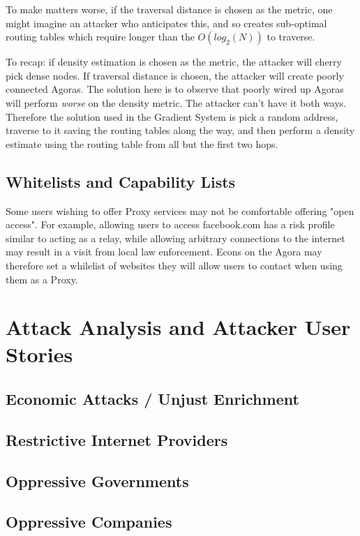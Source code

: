 \documentclass{article}
\begin{document}
To make matters worse, if the traversal distance is chosen as the metric, one might imagine an attacker who anticipates this, and so creates sub-optimal routing tables which require longer than the $O(log_2(N))$ to traverse.

To recap: if density estimation is chosen as the metric, the attacker will cherry pick dense nodes. If traversal distance is chosen, the attacker will create poorly connected Agoras. The solution here is to observe that poorly wired up Agoras will perform \emph{worse} on the density metric. The attacker can't have it both ways. Therefore the solution used in the Gradient System is pick a random address, traverse to it saving the routing tables along the way, and then perform a density estimate using the routing table from all but the first two hops.

\subsection{Whitelists and Capability Lists}

Some users wishing to offer Proxy services may not be comfortable offering "open access". For example, allowing users to access facebook.com has a risk profile similar to acting as a relay, while allowing arbitrary connections to the internet may result in a visit from local law enforcement. Econs on the Agora may therefore set a whilelist of websites they will allow users to contact when using them as a Proxy.

\section{Attack Analysis and Attacker User Stories}
\label{sec:attack-stories}

\subsection{Economic Attacks / Unjust Enrichment}

\subsection{Restrictive Internet Providers}

\subsection{Oppressive Governments}

\subsection{Oppressive Companies}
\end{document}
